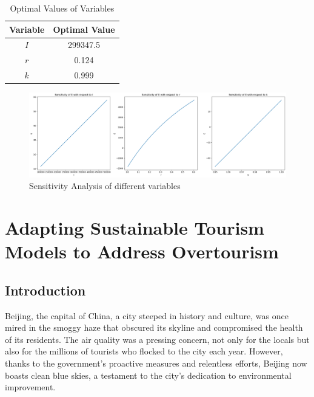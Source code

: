 \documentclass[UTF8]{mcmthesis}
\begin{document}
            \begin{table}[htbp]
                \centering
                \caption{Optimal Values of Variables}
                \begin{tabular}{cc}
                    \toprule
                    \textbf{Variable} & \textbf{Optimal Value} \\ 
                    \midrule
                    \( I \) & 299347.5 \\ 
                    \( r \) & 0.124 \\ 
                    \( k \) & 0.999 \\ 
                    \bottomrule
                \end{tabular}
                \label{tab:optimal_values}
            \end{table}

            \begin{figure}[htbp]
                \centering

                \includegraphics[width=16cm]{threelines.png}
                \caption{Sensitivity Analysis of different variables}
            \end{figure}
            
            

    \section{Adapting Sustainable Tourism Models to Address Overtourism}
            \subsection{Introduction}
            \hspace*{2em}Beijing, the capital of China, a city steeped in history and culture, was once mired in the smoggy haze that obscured its skyline and compromised the health of its residents. The air quality was a pressing concern, not only for the locals but also for the millions of tourists who flocked to the city each year. However, thanks to the government's proactive measures and relentless efforts, Beijing now boasts clean blue skies, a testament to the city's dedication to environmental improvement.
                        
\end{document}
